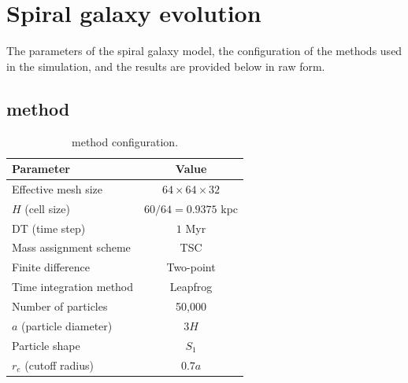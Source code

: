 \section{Spiral galaxy evolution}
The parameters of the spiral galaxy model, the configuration of the methods used in the simulation, and the results are provided below in raw form.
\subsection{\texorpdfstring{\PThreeM{}}{P3M} method}
\begin{table}[H]
    \centering
    \caption{\PThreeM{} method configuration.}
    \label{tab:p3m-method-parameters}
    \begin{tabular}{lc}
        \toprule
        \textbf{Parameter}      & \textbf{Value}           \\
        \midrule
        Effective mesh size     & $64 \times 64 \times 32$ \\
        $H$ (cell size)         & $60/64=0.9375$ kpc       \\
        DT (time step)          & $1$ Myr                  \\
        Mass assignment scheme  & TSC                      \\
        Finite difference       & Two-point                \\
        Time integration method & Leapfrog                 \\
        Number of particles     & 50,000                   \\
        $a$ (particle diameter) & $3H$                     \\
        Particle shape          & $S_1$                    \\
        $r_e$ (cutoff radius)   & $0.7a$                   \\
        \bottomrule
    \end{tabular}
\end{table}

